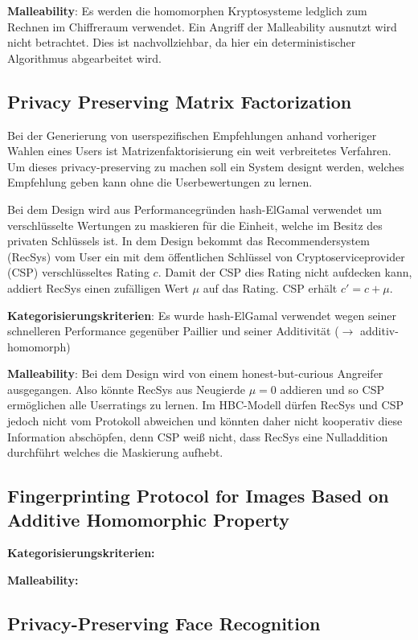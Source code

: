 \documentclass[12pt,a4paper]{scrartcl}	%
\begin{document}
\textbf{Malleability}: Es werden die homomorphen Kryptosysteme ledglich zum Rechnen im Chiffreraum verwendet. Ein Angriff der Malleability ausnutzt wird nicht betrachtet. Dies ist nachvollziehbar, da hier ein deterministischer Algorithmus abgearbeitet wird.

\subsection{Privacy Preserving Matrix Factorization} \cite{nikolaenko2013privacy}
Bei der Generierung von userspezifischen Empfehlungen anhand vorheriger Wahlen eines Users ist Matrizenfaktorisierung ein weit verbreitetes Verfahren. Um dieses privacy-preserving zu machen soll ein System designt werden, welches Empfehlung geben kann ohne die Userbewertungen zu lernen.

Bei dem Design wird aus Performancegründen hash-ElGamal verwendet um verschlüsselte Wertungen zu maskieren für die Einheit, welche im Besitz des privaten Schlüssels ist. In dem Design bekommt das Recommendersystem (RecSys) vom User ein mit dem öffentlichen Schlüssel von Cryptoserviceprovider (CSP) verschlüsseltes Rating $c$. Damit der CSP dies Rating nicht aufdecken kann, addiert RecSys einen zufälligen Wert $\mu$ auf das Rating. CSP erhält $c'=c+\mu$.

\textbf{Kategorisierungskriterien}: Es wurde hash-ElGamal verwendet wegen seiner schnelleren Performance gegenüber Paillier und seiner Additivität ($\rightarrow$ additiv-homomorph)

\textbf{Malleability}: Bei dem Design wird von einem honest-but-curious Angreifer ausgegangen. Also könnte RecSys aus Neugierde $\mu=0$ addieren und so CSP ermöglichen alle Userratings zu lernen. Im HBC-Modell dürfen RecSys und CSP jedoch nicht vom Protokoll abweichen und könnten daher nicht kooperativ diese Information abschöpfen, denn CSP weiß nicht, dass RecSys eine Nulladdition durchführt welches die Maskierung aufhebt.

\subsection{Fingerprinting Protocol for Images Based on Additive Homomorphic Property} \cite{kuribayashi2005fingerprinting}

\textbf{Kategorisierungskriterien:} 

\textbf{Malleability:}

\subsection{Privacy-Preserving Face Recognition} \cite{erkin2009privacy}
\end{document}
